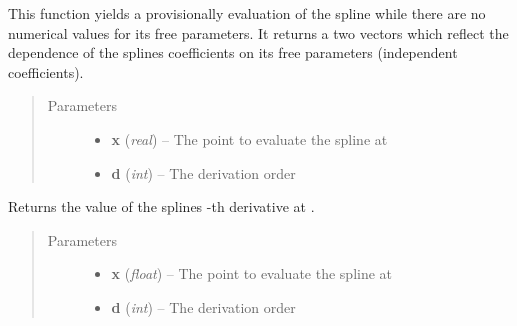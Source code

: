 \documentclass[letterpaper,10pt,english]{sphinxmanual}
\begin{document}
\begin{fulllineitems}
\begin{fulllineitems}
\label{pytrajectory:pytrajectory.spline.CubicSpline.prov_evalf}
This function yields a provisionally evaluation of the spline while there are no numerical
values for its free parameters.
It returns a two vectors which reflect the dependence of the splines coefficients
on its free parameters (independent coefficients).
\begin{quote}\begin{description}
\item[{Parameters}] \leavevmode\begin{itemize}
\item {} 
\textbf{x} (\emph{real}) -- The point to evaluate the spline at

\item {} 
\textbf{d} (\emph{int}) -- The derivation order

\end{itemize}

\end{description}\end{quote}

\end{fulllineitems}


\begin{fulllineitems}
\label{pytrajectory:pytrajectory.spline.CubicSpline.evalf}
Returns the value of the splines -th derivative at .
\begin{quote}\begin{description}
\item[{Parameters}] \leavevmode\begin{itemize}
\item {} 
\textbf{x} (\emph{float}) -- The point to evaluate the spline at

\item {} 
\textbf{d} (\emph{int}) -- The derivation order

\end{itemize}

\end{description}\end{quote}

\end{fulllineitems}



\end{fulllineitems}
\end{document}

